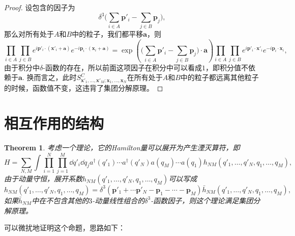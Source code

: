 \documentclass[11pt]{article}
\theoremstyle{definition}
\theoremstyle{plain}
\newtheorem{thm}[para]{Theorem}
\begin{document}
\begin{proof}
设包含的因子为
\[
	\delta^3\biggl(\sum_{i\in A}\bm{p}'_i-\sum_{j\in B}\bm{p}_j\biggr),
\]
那么对所有处于$A$和$B$中的粒子，我们都平移$\bm{a}$，则
\[
	\prod_{i\in A}\prod_{j\in B}e^{i \bm{p}'_i\cdot (\bm{x}'_i+\bm{a})}e^{-i \bm{p}_i\cdot (\bm{x}_i+\bm{a})}=\exp\left(\biggl(\sum_{i\in A}\bm{p}'_i-\sum_{j\in B}\bm{p}_j\biggr)\cdot \bm{a}\right)\prod_{i\in A}\prod_{j\in B}e^{i \bm{p}'_i\cdot \bm{x}'_i}e^{-i \bm{p}_i\cdot \bm{x}_i},
\]
由于积分中$\delta$-函数的存在，所以前面这项因子在积分中可以看成$1$，即积分值不依赖于$\bm{a}$. 换而言之，此时$S^C_{\bm{x}'_1,\dots,\bm{x}'_M;\bm{x}_1,\dots,\bm{x}_N}$在所有处于$A$和$B$中的粒子都远离其他粒子的时候，函数值不变，这违背了集团分解原理。
\end{proof}

\section{相互作用的结构}

\begin{thm}
考虑一个理论，它的Hamilton量可以展开为产生湮灭算符，即
\[
	H=\sum_{N,M}\int \prod_{i=1}^N\prod_{j=1}^M \dd q'_i \dd q_j a^\dag (q'_1)\cdots a^\dag (q'_N) a(q_M)\cdots a(q_1)h_{NM}(q'_1,\dots,q'_N,q_1,\dots,q_M),
\]
由于动量守恒，展开系数$h_{NM}(q'_1,\dots,q'_N,q_1,\dots,q_M)$可以写成
\[
	h_{NM}(q'_1,\dots,q'_N,q_1,\dots,q_M)=\delta^3(\bm{p}'_1+\cdots \bm{p}'_N-\bm{p}_1-\cdots-\bm{p}_M)\bar{h}_{NM}(q'_1,\dots,q'_N,q_1,\dots,q_M),
\]
如果$\bar{h}_{NM}$中在不包含其他的$3$-动量线性组合的$\delta^3$-函数因子，则这个理论满足集团分解原理。
\end{thm}

可以微扰地证明这个命题，思路如下：
\end{document}
